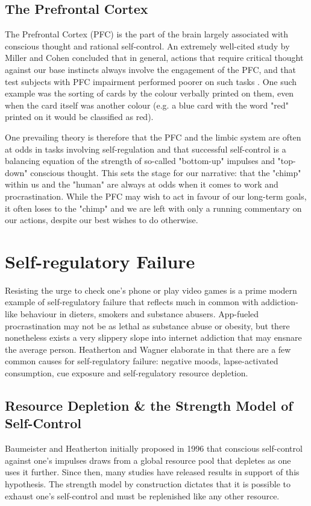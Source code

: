 \subsection{The Prefrontal Cortex}
The Prefrontal Cortex (PFC) is the part of the brain largely associated with conscious thought and rational self-control. An extremely well-cited study by Miller and Cohen concluded that in general, actions that require critical thought against our base instincts always involve the engagement of the PFC, and that test subjects with PFC impairment performed poorer on such tasks \cite{miller2001integrative}. One such example was the sorting of cards by the colour verbally printed on them, even when the card itself was another colour (e.g. a blue card with the word "red" printed on it would be classified as red).

One prevailing theory is therefore that the PFC and the limbic system are often at odds in tasks involving self-regulation \cite{heatherton2011cognitive} and that successful self-control is a balancing equation of the strength of so-called "bottom-up" impulses and "top-down" conscious thought. This sets the stage for our narrative: that the "chimp" within us and the "human" are always at odds when it comes to work and procrastination. While the PFC may wish to act in favour of our long-term goals, it often loses to the "chimp" and we are left with only a running commentary on our actions, despite our best wishes to do otherwise.

\section{Self-regulatory Failure}
Resisting the urge to check one's phone or play video games is a prime modern example of self-regulatory failure that reflects much in common with addiction-like behaviour in dieters, smokers and substance abusers. App-fueled procrastination may not be as lethal as substance abuse or obesity, but there nonetheless exists a very slippery slope into internet addiction that may ensnare the average person. Heatherton and Wagner elaborate in \cite{heatherton2011cognitive} that there are a few common causes for self-regulatory failure: negative moods, lapse-activated consumption, cue exposure and self-regulatory resource depletion.

\subsection{Resource Depletion \& the Strength Model of Self-Control}
Baumeister and Heatherton \cite{baumeister1996self} initially proposed in 1996 that conscious self-control against one's impulses draws from a global resource pool that depletes as one uses it further. Since then, many studies have released results in support of this hypothesis. The strength model by construction dictates that it is possible to exhaust one's self-control and must be replenished like any other resource.

